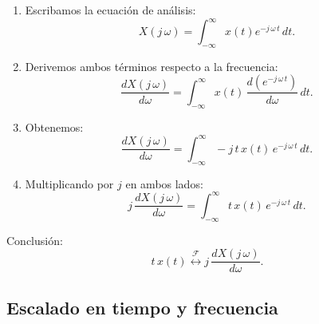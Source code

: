 \documentclass[11pt,a4paper,openany]{book}
\begin{document}
\begin{enumerate}
	\item Escribamos la ecuación de análisis:
	\begin{equation}
		X(j \, \omega) = \int_{-\infty}^{\infty} x(t) e^{-j \, \omega \, t} \, dt.
	\end{equation}
	
	\item Derivemos ambos términos respecto a la frecuencia:
	\begin{equation}
		\frac{dX(j \, \omega)}{d\omega} = \int_{-\infty}^{\infty} x(t) \, \frac{d(e^{-j \, \omega \, t})}{d\omega} \, dt.
	\end{equation}
	
	\item Obtenemos:
	\begin{equation}
		\frac{dX(j \, \omega)}{d\omega} = \int_{-\infty}^{\infty} -j \, t \, x(t) \, e^{-j \, \omega \, t} \, dt.
	\end{equation}
	
	\item Multiplicando por $j$ en ambos lados:
	\begin{equation}
		j \, \frac{dX(j \, \omega)}{d\omega} = \int_{-\infty}^{\infty} t \, x(t) \, e^{-j \, \omega \, t} \, dt.
	\end{equation}
	
\end{enumerate}

Conclusión:
\begin{equation}
	t \, x(t) \stackrel{\mathcal{F}}{\longleftrightarrow} j \, \frac{dX(j \, \omega)}{d\omega} .
\end{equation}


\subsection{Escalado en tiempo y frecuencia}
\end{document}
